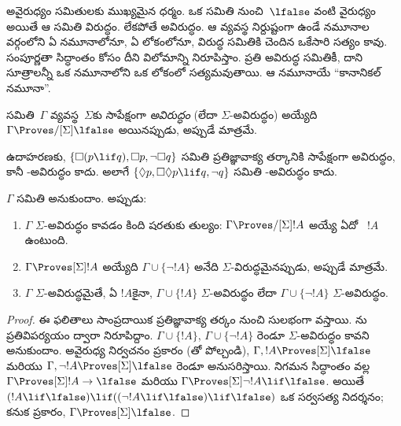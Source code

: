 \documentclass[../../../include/open-logic-section]{subfiles}
\begin{document}


అవైరుధ్యం  సమితులకు ముఖ్యమైన ధర్మం.
ఒక  సమితి నుంచి~$\lfalse$ వంటి
వైరుధ్యం  అయితే ఆ సమితి
విరుద్ధం. లేకపోతే అవిరుద్ధం. ఆ వ్యవస్థ నిర్దుష్టంగా ఉండే నమూనాల
వర్గంలోని ఏ నమూనాలోనూ, ఏ లోకంలోనూ, విరుద్ధ సమితికి చెందిన
 ఒకేసారి సత్యం కావు.
సంపూర్ణతా సిద్ధాంతం కోసం దీని విలోమాన్ని నిరూపిస్తాం. ప్రతి
అవిరుద్ధ సమితికీ, దాని సూత్రాలన్నీ ఒక నమూనాలోని ఒక లోకంలో సత్యమవుతాయి.
ఆ నమూనాయే ``కానానికల్ నమూనా''.

\begin{defn}
  సమితి~$\Gamma$ వ్యవస్థ~$\Sigma$కు సాపేక్షంగా
  \emph{అవిరుద్ధం} (లేదా $\Sigma$-అవిరుద్ధం) అయ్యేది
  $\Gamma \Proves/[\Sigma] \lfalse$ అయినప్పుడు, అప్పుడే మాత్రమే.
\end{defn}

ఉదాహరణకు, $\{ \Box(p \lif q), \Box p, \lnot\Box q \}$ సమితి
ప్రతిజ్ఞావాక్య తర్కానికి సాపేక్షంగా అవిరుద్ధం, కానీ
-అవిరుద్ధం కాదు. అలాగే $\{ \Diamond p, \Box\Diamond
p \lif q, \lnot q \}$ సమితి -అవిరుద్ధం కాదు.

\begin{prop}
  $\Gamma$  సమితి అనుకుందాం. అప్పుడు:
  \begin{enumerate}
  \item $\Gamma$ $\Sigma$-అవిరుద్ధం కావడం కింది షరతుకు తుల్యం:
    $\Gamma \Proves/[\Sigma] !A$ అయ్యే ఏదో
    ~$!A$ ఉంటుంది.
  \item {}%
    $\Gamma \Proves[\Sigma] !A$ అయ్యేది
    $\Gamma \cup \{ \lnot!A \}$ అనేది $\Sigma$-విరుద్ధమైనప్పుడు, అప్పుడే మాత్రమే.
  \item {}%
    $\Gamma$ $\Sigma$-అవిరుద్ధమైతే, ఏ
     $!A$కైనా,
    $\Gamma \cup \{ !A \}$ $\Sigma$-అవిరుద్ధం లేదా
    $\Gamma \cup \{ \lnot!A \}$ $\Sigma$-అవిరుద్ధం.
  \end{enumerate}
\end{prop}

\begin{proof}
  ఈ ఫలితాలు సాంప్రదాయిక ప్రతిజ్ఞావాక్య తర్కం నుంచి సులభంగా
  వస్తాయి. ను ప్రతివిపర్యయం ద్వారా
  నిరూపిద్దాం. $\Gamma \cup \{ !A \}$,
  $\Gamma \cup \{ \lnot!A \}$ రెండూ $\Sigma$-అవిరుద్ధం కావని అనుకుందాం.
  అవైరుధ్య నిర్వచనం ప్రకారం (తో
  పోల్చండి), $\Gamma, !A \Proves[\Sigma] \lfalse$ మరియు
  $\Gamma, \lnot !A \Proves[\Sigma] \lfalse$ రెండూ అనుసరిస్తాయి.
  నిగమన సిద్ధాంతం వల్ల $\Gamma \Proves[\Sigma] !A \to \lfalse$
  మరియు $\Gamma \Proves[\Sigma] \lnot!A \lif \lfalse$.
  అయితే $(!A \lif \lfalse) \lif ((\lnot!A \lif \lfalse) \lif
  \lfalse)$ ఒక సర్వసత్య నిదర్శనం; కనుక
  ప్రకారం, $\Gamma \Proves[\Sigma] \lfalse$.
\end{proof}
\end{document}
